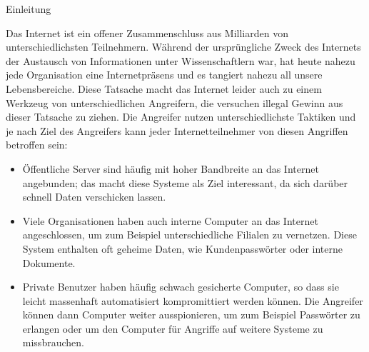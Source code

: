 \documentclass[final]{beamer}
\newlength{\sepwid}
\newlength{\twocolwid}
\begin{document}
\begin{frame}[t]
\begin{columns}[t, totalwidth=\textwidth]
\begin{column}{\twocolwid} %


\begin{block}{Einleitung}

Das Internet ist ein offener Zusammenschluss aus Milliarden von unterschiedlichsten
Teilnehmern. Während der ursprüngliche Zweck des Internets der Austausch von Informationen
unter Wissenschaftlern war, hat heute nahezu jede Organisation eine Internetpräsens und
es tangiert nahezu all unsere Lebensbereiche. Diese Tatsache macht das Internet leider auch
zu einem Werkzeug von unterschiedlichen Angreifern, die versuchen illegal Gewinn aus dieser
Tatsache zu ziehen.
Die Angreifer nutzen unterschiedlichste Taktiken und je nach Ziel des Angreifers kann jeder
Internetteilnehmer von diesen Angriffen betroffen sein:

\begin{itemize}
 \item Öffentliche Server sind häufig mit hoher Bandbreite an das Internet angebunden; das 
 macht diese Systeme als Ziel interessant, da sich darüber schnell Daten verschicken lassen.
 \item Viele Organisationen haben auch interne Computer an das Internet angeschlossen, um 
 zum Beispiel unterschiedliche Filialen zu vernetzen. Diese System enthalten oft geheime Daten, 
 wie Kundenpasswörter oder interne Dokumente.
 \item Private Benutzer haben häufig schwach gesicherte Computer, so dass sie leicht massenhaft
 automatisiert kompromittiert werden können. Die Angreifer können dann Computer weiter ausspionieren, 
 um zum Beispiel Passwörter zu erlangen oder um den Computer für Angriffe auf weitere Systeme 
 zu missbrauchen.
\end{itemize}

\end{block}


\begin{column}{\sepwid}\end{column} %


\end{column}
\end{columns}
\end{frame}
\end{document}
